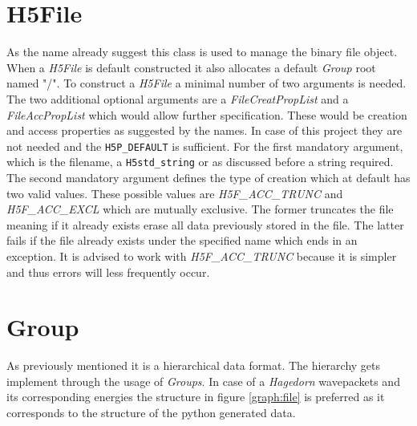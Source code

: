 \section{H5File}
As the name already suggest this class is used to manage the binary file object. When a \textit{H5File} is default constructed it also allocates a default \textit{Group} root named "/". To construct a \textit{H5File} a minimal number of two arguments is needed. The two additional optional arguments are a \textit{FileCreatPropList} and a \textit{FileAccPropList} which would allow further specification. These would be creation and access properties as suggested by the names. In case of this project they are not needed and the \texttt{H5P\_DEFAULT} is sufficient. For the first mandatory argument, which is the filename, a \texttt{H5std\_string} or as discussed before a string required. The second mandatory argument defines the type of creation which at default has two valid values. These possible values are \textit{H5F\_ACC\_TRUNC} and \textit{H5F\_ACC\_EXCL} which are mutually exclusive. The former truncates the file meaning if it already exists erase all data previously stored in the file. The latter fails if the file already exists under the specified name which ends in an exception. It is advised to work with \textit{H5F\_ACC\_TRUNC} because it is simpler and thus errors will less frequently occur.

\section{Group}
\label{seq:group}
As previously mentioned it is a hierarchical data format. The hierarchy gets implement through the usage of \textit{Groups}. In case of a \textit{Hagedorn} wavepackets and its corresponding energies the structure in figure \ref{graph:file} is preferred as it corresponds to the structure of the python generated data.


